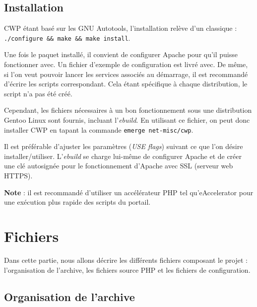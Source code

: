 \documentclass[a4paper,11pt]{report}
\newcommand{\cwp}{%
  CWP%
}
\begin{document}
\section{Installation}

\cwp{} étant basé sur les GNU Autotools, l'installation relève d'un
classique :\\\verb!./configure && make && make install!.

Une fois le paquet installé, il convient de configurer Apache pour qu'il
puisse fonctionner avec. Un fichier d'exemple de configuration est livré avec.
De même, si l'on veut pouvoir lancer les services associés au démarrage, il
est recommandé d'écrire les scripts correspondant. Cela étant spécifique à
chaque distribution, le script n'a pas été créé.

Cependant, les fichiers nécessaires à un bon fonctionnement sous une
distribution Gentoo Linux sont fournis, incluant l'\emph{ebuild}. En utilisant
ce fichier, on peut donc installer \cwp{} en tapant la commande
\og\verb!emerge net-misc/cwp!\fg.

Il est préférable d'ajuster les paramètres (\emph{USE flags}) suivant ce que
l'on désire installer/utiliser. L'\emph{ebuild} se charge lui-même de
configurer Apache et de créer une clé autosignée pour le fonctionnement
d'Apache avec SSL (serveur web HTTPS).

\textbf{Note} : il est recommandé d'utiliser un accélérateur PHP tel
qu'eAccelerator pour une exécution plus rapide des scripts du portail.


\chapter{Fichiers}

Dans cette partie, nous allons décrire les différents fichiers composant le
projet : l'organisation de l'archive, les fichiers source PHP et les fichiers
de configuration.

\section{Organisation de l'archive}
\end{document}
